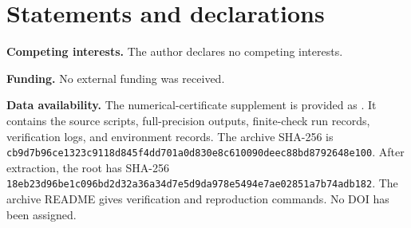 \documentclass{amsart}
\numberwithin{equation}{section}
\numberwithin{table}{section}
\theoremstyle{definition}
\begin{document}
\section*{Statements and declarations}
\textbf{Competing interests.} The author declares no competing interests.

\textbf{Funding.} No external funding was received.

\textbf{Data availability.} The numerical-certificate supplement is provided as
. It contains the source
scripts, full-precision outputs, finite-check run records, verification
logs, and environment records. The archive SHA-256 is
\texttt{cb9d7b96\allowbreak{}ce1323c9\allowbreak{}118d845f\allowbreak{}4dd701a0\allowbreak{}d830e8c6\allowbreak{}10090dee\allowbreak{}c88bd879\allowbreak{}2648e100}.
After extraction, the root  has SHA-256
\texttt{18eb23d9\allowbreak{}6be1c096\allowbreak{}bd2d32a3\allowbreak{}6a34d7e5\allowbreak{}d9da978e\allowbreak{}5494e7ae\allowbreak{}02851a7b\allowbreak{}74adb182}.
The archive README gives verification and reproduction commands.
No DOI has been assigned.
\end{document}

